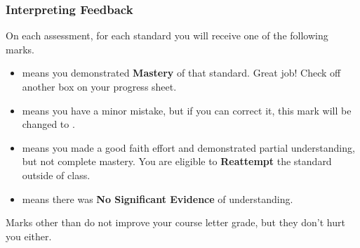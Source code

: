 \documentclass{beamer}
\begin{document}
\begin{frame}\frametitle{Interpreting Feedback}
On each assessment, for each standard you will receive one of the following marks.
\begin{itemize}
\item \masteryMark{} means you demonstrated \textbf{Mastery} of that standard.
      Great job!  Check off another box on your progress sheet.
\item \minorMark{} means you have a minor mistake, but if you can correct it,
      this mark will be changed to \masteryMark{}.
\item \reattemptMark{} means you made a good faith effort and demonstrated
      partial understanding, but not complete mastery. You are eligible to
      \textbf{Reattempt} the standard outside of class.
\item \noMark{} means there was \textbf{No Significant Evidence} of understanding.
\end{itemize}

\pause

\vspace{0.2in}

Marks other than \masteryMark{} do not improve your course letter grade, but
they don't hurt you either.
\end{frame}
\end{document}
